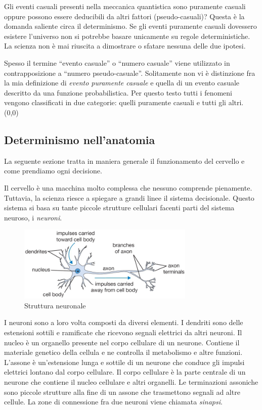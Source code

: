\documentclass[a4paper, 12pt]{article}
\newcommand{\quotes}[1]{``#1''}
\newcommand{\ownleft}[0]{%
    \makebox(0,0){
        \stackon[-8pt]{\phantom{A}}{
            \begin{tikzpicture}
                \fill (0,0) -- (0.3,0) -- ++(0,0.05) -- (0,0.05);
                \fill (0.3,0) -- ++(0,0.3) -- (0.25,0.3) -- (0.25,0.05);
            \end{tikzpicture}
        }
    }
}
\begin{document}
Gli eventi casuali presenti nella meccanica quantistica sono puramente casuali
oppure possono essere deducibili da altri fattori (pseudo-casuali)?
Questa è la domanda saliente circa il determinismo.
Se gli eventi puramente casuali dovessero esistere l'universo non si potrebbe basare unicamente
su regole deterministiche.
La scienza non è mai riuscita a dimostrare o sfatare nessuna delle due ipotesi.

Spesso il termine \quotes{evento casuale} o \quotes{numero casuale} viene utilizzato
in contrapposizione a \quotes{numero pseudo-casuale}.
Solitamente non vi è distinzione fra la mia definizione di \textit{evento puramente casuale}
e quella di un evento casuale descritto da una funzione probabilistica.
Per questo testo tutti i fenomeni vengono classificati in due categorie:
quelli puramente casuali e tutti gli altri.%
\ownleft{}

\subsection{Determinismo nell'anatomia}

La seguente sezione tratta in maniera generale il funzionamento del cervello
e come prendiamo ogni decisione.

Il cervello è una macchina molto complessa che nessuno
comprende pienamente. Tuttavia, la scienza riesce a spiegare a grandi linee
il sistema decisionale. Questo sistema si basa su tante piccole strutture cellulari
facenti parti del sistema neuroso, i \textit{neuroni}.

\begin{figure}[ht]
    \centering
    \includegraphics[width=0.75\textwidth]{neuron.png}
    \caption{Struttura neuronale}
\end{figure}

I neuroni sono a loro volta composti da diversi elementi.
I dendriti sono delle estensioni sottili e ramificate che ricevono segnali elettrici da altri neuroni.
Il nucleo è un organello presente nel corpo cellulare di un neurone.
Contiene il materiale genetico della cellula e ne controlla il metabolismo e
altre funzioni.
L'assone è un'estensione lunga e sottile di un neurone che conduce gli impulsi elettrici
lontano dal corpo cellulare.
Il corpo cellulare è la parte centrale di un neurone che contiene
il nucleo cellulare e altri organelli.
Le terminazioni assoniche sono piccole strutture alla fine di un assone che trasmettono
segnali ad altre cellule. La zone di connessione
fra due neuroni viene chiamata \textit{sinapsi}.
\end{document}
